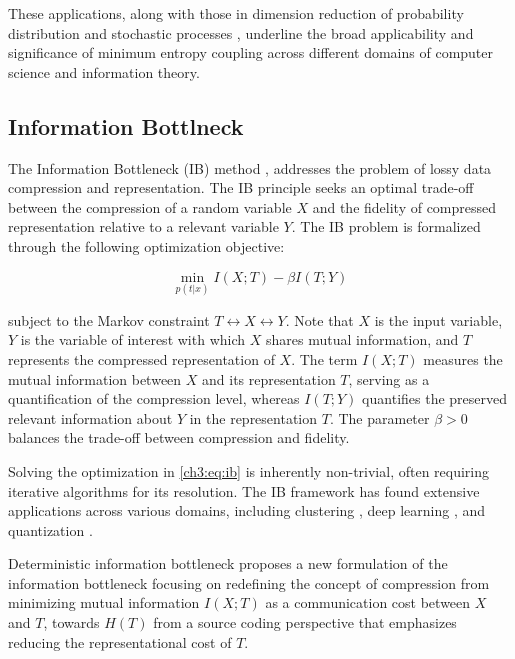 These applications, along with those in dimension reduction of probability distribution \cite{cicalese2016approximating} and stochastic processes \cite{vidyasagar2012metric}, underline the broad applicability and significance of minimum entropy coupling across different domains of computer science and information theory.


\subsection{Information Bottlneck}
The Information Bottleneck (IB) method \cite{tishby2000information}, addresses the problem of lossy data compression and representation. The IB principle seeks an optimal trade-off between the compression of a random variable \(X\) and the fidelity of compressed representation relative to a relevant variable \(Y\). The IB problem is formalized through the following optimization objective:

\begin{equation} \label{ch3:eq:ib}
    \min_{p(t|x)} I(X;T) - \beta I(T;Y)
\end{equation}

subject to the Markov constraint $T \leftrightarrow X \leftrightarrow Y$.
Note that \(X\) is the input variable, \(Y\) is the variable of interest with which \(X\) shares mutual information, and \(T\) represents the compressed representation of \(X\).  The term \(I(X;T)\) measures the mutual information between \(X\) and its representation \(T\), serving as a quantification of the compression level, whereas \(I(T;Y)\) quantifies the preserved relevant information about \(Y\) in the representation \(T\). The parameter \(\beta > 0\) balances the trade-off between compression and fidelity.

Solving the optimization in \eqref{ch3:eq:ib} is inherently non-trivial, often requiring iterative algorithms for its resolution. The IB framework has found extensive applications across various domains, including clustering \cite{slonim2000document}, deep learning \cite{tishby2015deep, alemi2016deep}, and quantization \cite{bhatt2021information}.

Deterministic information bottleneck \cite{strouse2017deterministic} proposes a new formulation of the information bottleneck focusing on redefining the concept of compression from minimizing mutual information \(I(X; T)\) as a communication cost between \(X\) and \(T\), towards $H(T)$ from a source coding perspective that emphasizes reducing the representational cost of \(T\). 

